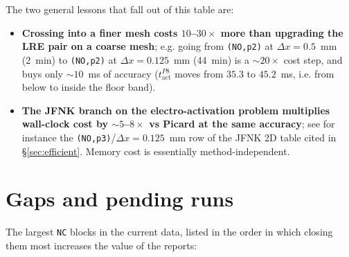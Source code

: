 \documentclass[11pt,a4paper]{article}
\newcommand{\tact}{t_{\text{act}}^{P8}}
\newcommand{\code}[1]{\texttt{\small #1}}
\begin{document}
The two general lessons that fall out of this table are:

\begin{itemize}[leftmargin=*]
\item \textbf{Crossing into a finer mesh costs $10$--$30\times$ more
than upgrading the LRE pair on a coarse mesh}; e.g. going from
\code{(NO,p2)} at $\Delta x = 0.5$~mm (2~min) to \code{(NO,p2)} at
$\Delta x = 0.125$~mm (44~min) is a $\sim 20\times$ cost step, and
buys only $\sim 10$~ms of accuracy ($\tact$ moves from $35.3$ to
$45.2$~ms, i.e. from below to inside the floor band).
\item \textbf{The JFNK branch on the electro-activation problem
multiplies wall-clock cost by $\sim 5$--$8\times$ vs Picard at the
same accuracy}; see for instance the
\code{(NO,p3)}/$\Delta x = 0.125$~mm row of the JFNK 2D table cited
in \S\ref{sec:efficient}. Memory cost is essentially method-independent.
\end{itemize}

\section{Gaps and pending runs}
\label{sec:gaps}

The largest \code{NC} blocks in the current data, listed in the order
in which closing them most increases the value of the reports:
\end{document}
